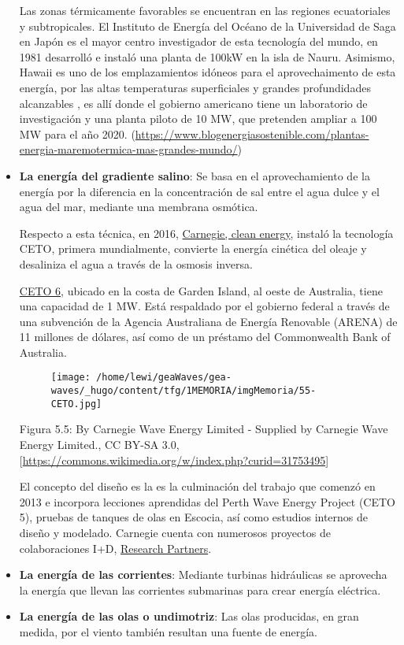 \begin{itemize}
  Las zonas térmicamente favorables se encuentran en las regiones
  ecuatoriales y subtropicales. El Instituto de Energía del Océano de la
  Universidad de Saga en Japón es el mayor centro investigador de esta
  tecnología del mundo, en 1981 desarrolló e instaló una planta de 100kW
  en la isla de Nauru. Asimismo, Hawaii es uno de los emplazamientos
  idóneos para el aprovechaimento de esta energía, por las altas
  temperaturas superficiales y grandes profundidades alcanzables , es
  allí donde el gobierno americano tiene un laboratorio de investigación
  y una planta piloto de 10 MW, que pretenden ampliar a 100 MW para el
  año 2020.
  (\url{https://www.blogenergiasostenible.com/plantas-energia-maremotermica-mas-grandes-mundo/})
\item
  \textbf{La energía del gradiente salino}: Se basa en el
  aprovechamiento de la energía por la diferencia en la concentración de
  sal entre el agua dulce y el agua del mar, mediante una membrana
  osmótica.

  Respecto a esta técnica, en 2016,
  \href{https://www.carnegiece.com/wave/}{Carnegie, clean energy},
  instaló la tecnología CETO, primera mundialmente, convierte la energía
  cinética del oleaje y desaliniza el agua a través de la osmosis
  inversa.

  \href{https://www.carnegiece.com/project/ceto-6-garden-island/}{CETO
  6}, ubicado en la costa de Garden Island, al oeste de Australia, tiene
  una capacidad de 1 MW. Está respaldado por el gobierno federal a
  través de una subvención de la Agencia Australiana de Energía
  Renovable (ARENA) de 11 millones de dólares, así como de un préstamo
  del Commonwealth Bank of Australia.

  \begin{figure}
  \centering
  \texttt{[image: /home/lewi/geaWaves/gea-waves/\_hugo/content/tfg/1MEMORIA/imgMemoria/55-CETO.jpg]}
  \caption{}
  \end{figure}

  Figura 5.5: By Carnegie Wave Energy Limited - Supplied by Carnegie
  Wave Energy Limited., CC BY-SA 3.0,
  {[}\url{https://commons.wikimedia.org/w/index.php?curid=31753495}{]}

  El concepto del diseño es la es la culminación del trabajo que comenzó
  en 2013 e incorpora lecciones aprendidas del Perth Wave Energy Project
  (CETO 5), pruebas de tanques de olas en Escocia, así como estudios
  internos de diseño y modelado. Carnegie cuenta con numerosos proyectos
  de colaboraciones I+D,
  \href{https://www.carnegiece.com/partner/research-partners/}{Research
  Partners}.
\item
  \textbf{La energía de las corrientes}: Mediante turbinas hidráulicas
  se aprovecha la energía que llevan las corrientes submarinas para
  crear energía eléctrica.
\item
  \textbf{La energía de las olas o undimotriz}: Las olas producidas, en
  gran medida, por el viento también resultan una fuente de energía. 
\end{itemize}

